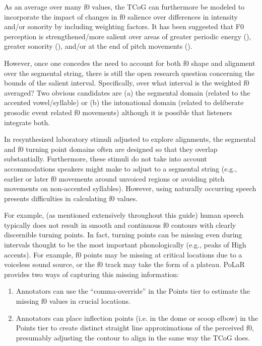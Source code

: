 \documentclass[11pt, twoside]{memoir}
\begin{document}
As an average over many f0 values, the TCoG can furthermore be modeled to incorporate the impact of changes in f0 salience over differences in intensity and/or sonority by including weighting factors.  It has been suggested that F0 perception is strengthened\slash more salient over areas of greater periodic energy (\citealt{albert-18}), greater sonority (\citealt{barnes-14}), and/or at the end of  pitch movements (\citealt{dalessandro-95}). 

However, once one concedes the need to account for both f0 shape and alignment over the segmental string, there is  still the open research question concerning the bounds of the salient interval. Specifically, over what interval is the weighted f0 averaged?  Two obvious candidates are (a) the segmental domain (related to the accented vowel\slash syllable) or (b) the intonational domain (related to deliberate prosodic event related f0 movements) although it is possible that listeners integrate both.

In resynthesized laboratory stimuli adjusted to explore alignments, the segmental and f0 turning point domains often are designed so that they overlap substantially.  Furthermore, these stimuli do not take into account accommodations speakers might make to adjust to a segmental string (e.g., earlier or later f0 movements around unvoiced regions or avoiding pitch movements on non-accented syllables). However, using naturally occurring speech presents difficulties in calculating f0 values.

For example,  (as mentioned extensively throughout this guide) human speech typically does not result in smooth and continuous f0 contours with clearly discernible turning points.  In fact, turning points can be missing even during intervals thought to be the most important phonologically (e.g., peaks of High accents). For example, f0 points may be missing at critical locations due to a voiceless sound source, or the f0 track may take the form of a plateau.  PoLaR provides two ways of capturing this missing information: 

\begin{enumerate}
	\item Annotators can use the “comma-override” in the Points tier to estimate the missing f0 values in crucial locations.
	\item Annotators can place inflection points (i.e. in the dome or scoop elbow) in the Points tier to create distinct straight line approximations of the perceived f0, presumably adjusting the contour to align in the same way the TCoG does.
\end{enumerate}
\end{document}
